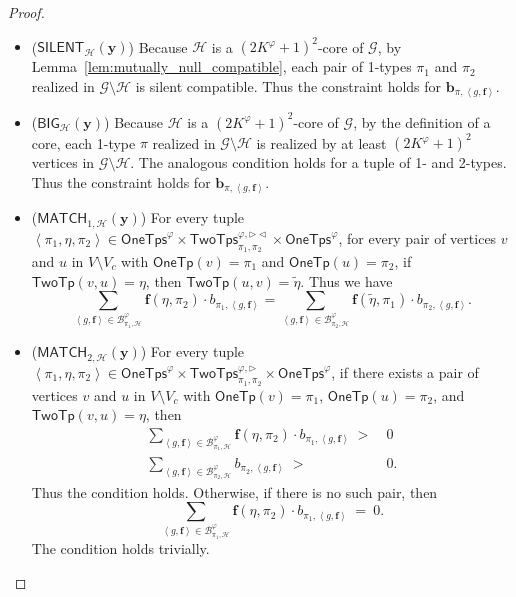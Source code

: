 \documentclass[10pt,a4paper]{article}
\theoremstyle{definition}
\theoremstyle{remark}
\newcommand{\cB}{\mathcal{B}}
\newcommand{\cG}{\mathcal{G}}
\newcommand{\cH}{\mathcal{H}}
\newcommand{\cK}{\mathsf{TwoTps}}
\newcommand{\bfb}{\mathbf{b}}
\newcommand{\bff}{\mathbf{f}}
\newcommand{\bfy}{\mathbf{y}}
\newcommand{\onetypeof}{\mathsf{OneTp}}
\newcommand{\twotypeof}{\mathsf{TwoTp}}
\newcommand{\onetypes}{\mathsf{OneTps}}
\newcommand{\tuple}[1]       {\left\langle #1 \right\rangle}
\newcommand{\dual}[1] {\widetilde{ #1 }}
\newcommand{\trif} {\triangleright}
\newcommand{\trib} {\triangleleft}
\newcommand{\cKvpf}     {\cK^{\varphi, \trif}}
\newcommand{\cKvpfb}    {\cK^{\varphi, \trif\trib}}
\newcommand{\silent}  {\mathsf{SILENT}}
\newcommand{\bige}  {\mathsf{BIG}}
\newcommand{\match} {\mathsf{MATCH}}
\begin{document}
\begin{proof}
\begin{itemize}
        \item ($\silent_{\cH}(\bfy)$)
            Because $\cH$ is a $(2K^\varphi+1)^2$-core of $\cG$,
            by Lemma~\ref{lem:mutually_null_compatible},
            each pair of 1-types $\pi_1$ and $\pi_2$ realized in $\cG \setminus \cH$ is silent compatible.
            Thus the constraint holds for $\bfb_{\pi, \tuple{g, \bff}}$.

        \item ($\bige_{\cH}(\bfy)$)
            Because $\cH$ is a $(2K^\varphi+1)^2$-core of $\cG$,
            by the definition of a core,
            each 1-type $\pi$ realized in $\cG \setminus \cH$
            is realized by at least $(2K^\varphi+1)^2$ vertices in $\cG \setminus \cH$.
            The analogous condition holds for a tuple of 1- and 2-types.
            Thus the constraint holds for $\bfb_{\pi, \tuple{g, \bff}}$.

        \item ($\match_{1, \cH}(\bfy)$)
            For every tuple $\tuple{\pi_1, \eta, \pi_2} \in \onetypes^\varphi \times \cKvpfb_{\pi_1, \pi_2} \times \onetypes^\varphi$,
            for every pair of vertices $v$ and $u$ in $V \setminus V_c$
            with $\onetypeof(v) = \pi_1$ and $\onetypeof(u) = \pi_2$,
            if $\twotypeof(v, u) = \eta$,
            then $\twotypeof(u, v) = \dual{\eta}$.
            Thus we have
            \begin{equation*}
                \sum_{\tuple{g, \bff} \in \cB^\varphi_{\pi_1, \cH}} \bff(\eta, \pi_2) \cdot b_{\pi_1, \tuple{g, \bff}}
                =
                \sum_{\tuple{g, \bff} \in \cB^\varphi_{\pi_2, \cH}} \bff(\dual{\eta}, \pi_1) \cdot b_{\pi_2, \tuple{g, \bff}}.
            \end{equation*}

        \item ($\match_{2, \cH}(\bfy)$)
            For every tuple $\tuple{\pi_1, \eta, \pi_2} \in \onetypes^\varphi \times \cKvpf_{\pi_1, \pi_2} \times \onetypes^\varphi$,
            if there exists a pair of vertices $v$ and $u$ in $V \setminus V_c$
            with $\onetypeof(v) = \pi_1$, $\onetypeof(u) = \pi_2$,
            and $\twotypeof(v, u) = \eta$,
            then
            \begin{equation*}
                \begin{aligned}
                    \sum_{\tuple{g, \bff} \in \cB^\varphi_{\pi_1, \cH}} \bff(\eta, \pi_2) \cdot b_{\pi_1, \tuple{g, \bff}}\ >\ &0 \\
                    \sum_{\tuple{g, \bff} \in \cB^\varphi_{\pi_2, \cH}} b_{\pi_2, \tuple{g, \bff}}\ >\ &0.
                \end{aligned}
            \end{equation*}
            Thus the condition holds.
            Otherwise, if there is no such pair, then
            \begin{equation*}
                 \sum_{\tuple{g, \bff} \in \cB^\varphi_{\pi_1, \cH}} \bff(\eta, \pi_2) \cdot b_{\pi_1, \tuple{g, \bff}}\ =\ 0.   
            \end{equation*}
            The condition holds trivially.
    \end{itemize}



\end{proof}
\end{document}
